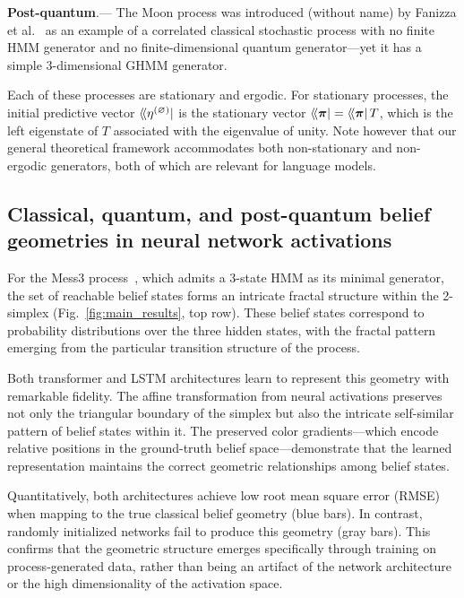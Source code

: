 \documentclass[prx,nofootinbib,onecolumn,showkeys,groupaddress,preprintnumbers,floatfix,
superscriptaddress]{revtex4-1}
\newcommand{\stationary}{\boldsymbol{\pi}}
\newcommand{\dbra}[1]{\bra{ \! \langle #1}}
\begin{document}
 \textbf{Post-quantum}.---
The Moon process was introduced (without name) by Fanizza et al.~\cite{Fanizza24_Quantum} 
as an example of a correlated classical stochastic process %
with no finite HMM generator and no finite-dimensional quantum generator---yet it has a simple 3-dimensional GHMM generator.
 
Each of these processes are stationary and ergodic. 
For stationary processes, the initial predictive vector $\dbra{\eta^{(\varnothing)}}$ is the stationary vector $\dbra{\stationary} = \dbra{\stationary} T$, 
which is the left eigenstate of $T$ associated with the eigenvalue of unity.
Note however that our general theoretical framework accommodates both non-stationary and non-ergodic generators, both of which are relevant for language models. 

\subsection{Classical, quantum, and post-quantum belief geometries in neural network activations}

For the Mess3 process~\cite{Marz17a, Shai24_Transformers}, which admits a 3-state HMM as its minimal generator, the set of reachable belief states forms an intricate fractal structure within the 2-simplex (Fig.~\ref{fig:main_results}, top row). These belief states correspond to probability distributions over the three hidden states, with the fractal pattern emerging from the particular transition structure of the process.

Both transformer and LSTM architectures learn to represent this geometry with remarkable fidelity. The affine transformation from neural activations preserves not only the triangular boundary of the simplex but also the intricate self-similar pattern of belief states within it. The preserved color gradients---which encode relative positions in the ground-truth belief space---demonstrate that the learned representation maintains the correct geometric relationships among belief states.

Quantitatively, both architectures achieve low root mean square error (RMSE) when mapping to the true classical belief geometry (blue bars). In contrast, randomly initialized networks fail to produce this geometry (gray bars). This confirms that the geometric structure emerges specifically through training on process-generated data, rather than being an artifact of the network architecture or the high dimensionality of the activation space.
\end{document}
